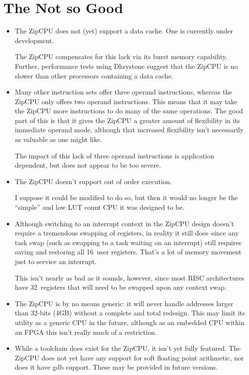 \documentclass{gqtekspec}
\begin{document}
\section{The Not so Good}
\begin{itemize}
\item The ZipCPU does not (yet) support a data cache.  One is currently under
	development.

	The ZipCPU compensates for this lack via its burst memory capability.
	Further, performance tests using Dhrystone suggest that the ZipCPU is
	no slower than other processors containing a data cache.

\item Many other instruction sets offer three operand instructions, whereas
	the ZipCPU only offers two operand instructions. This means that it
	may take the ZipCPU more instructions to do many of the same operations.
	The good part of this is that it gives the ZipCPU a greater amount of
	flexibility in its immediate operand mode, although that increased
	flexibility isn't necessarily as valuable as one might like.

	The impact of this lack of three operand instructions is application
	dependent, but does not appear to be too severe.

\item The ZipCPU doesn't support out of order execution.

	I suppose it could be modified to do so, but then it would no longer
	be the ``simple'' and low LUT count CPU it was designed to be.

\item Although switching to an interrupt context in the ZipCPU design doesn't
	require a tremendous swapping of registers, in reality it still
	does--since any task swap (such as swapping to a task waiting on an
	interrupt) still requires saving and restoring all 16~user registers.
	That's a lot of memory movement just to service an interrupt.

	This isn't nearly as bad as it sounds, however, since most RISC
	architectures have 32~registers that will need to be swapped upon any
	context swap.

\item The ZipCPU is by no means generic: it will never handle addresses
	larger than 32-bits (4GB) without a complete and total redesign.
	This may limit its utility as a generic CPU in the future, although
	as an embedded CPU within an FPGA this isn't really much of a
	restriction.

\item While a toolchain does exist for the ZipCPU, it isn't yet fully featured.
	The ZipCPU does not yet have any support for soft floating point
	arithmetic, nor does it have gdb support.  These may be provided
	in future versions.
\end{itemize}
\end{document}
